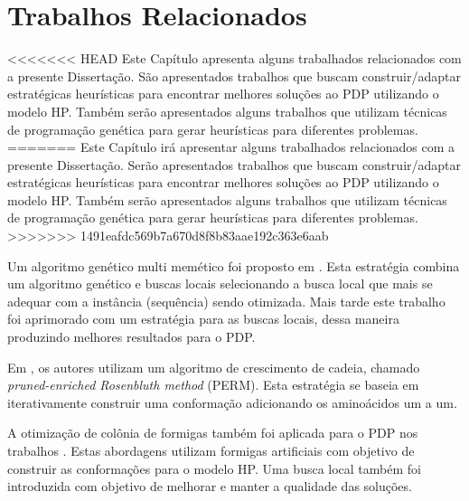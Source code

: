\chapter{Trabalhos Relacionados}
\label{cap:Trabalhos Relacionados}

<<<<<<< HEAD
Este Capítulo apresenta alguns trabalhados relacionados com a presente Dissertação. São apresentados trabalhos que buscam construir/adaptar estratégicas heurísticas para encontrar melhores soluções ao PDP utilizando o modelo HP. Também serão apresentados alguns trabalhos que utilizam técnicas de programação genética para gerar heurísticas para diferentes problemas.
=======
Este Capítulo irá apresentar alguns trabalhados relacionados com a presente Dissertação. Serão apresentados trabalhos que buscam construir/adaptar estratégicas heurísticas para encontrar melhores soluções ao PDP utilizando o modelo HP. Também serão apresentados alguns trabalhos que utilizam técnicas de programação genética para gerar heurísticas para diferentes problemas.
>>>>>>> 1491eafdc569b7a670d8f8b83aae192c363e6aab






Um algoritmo genético multi memético foi proposto em \cite{krasnogor2002multimeme}. Esta estratégia combina um algoritmo genético e buscas locais selecionando a busca local que mais se adequar com a instância (sequência) sendo otimizada. Mais tarde este trabalho foi aprimorado com um estratégia  para as buscas locais, dessa maneira produzindo melhores resultados para o PDP.

Em \cite{hsu2003growth}, os autores utilizam um algoritmo de crescimento de cadeia, chamado \textit{pruned-enriched Rosenbluth method} (PERM). Esta estratégia se baseia em iterativamente construir uma conformação adicionando os aminoácidos um a um. 

A otimização de colônia de formigas também foi aplicada para o PDP nos trabalhos \cite{shmygelska2002ant,shmygelska2003improved}. Estas abordagens utilizam formigas artificiais com objetivo de construir as conformações para o modelo HP. Uma busca local também foi introduzida com objetivo de melhorar e manter a qualidade das soluções. 

